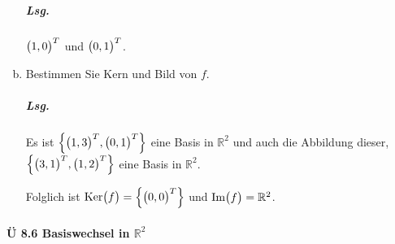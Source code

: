 \documentclass{scrreprt}
\begin{document}
\begin{enumerate}[(a)]
  \subparagraph{Lsg.} $\qty\big(1, 0)^T$ und $\qty\big(0, 1)^T$.

\item Bestimmen Sie Kern und Bild von $f$.

  \subparagraph{Lsg.} Es ist $\qty{\qty\big(1, 3)^T, \qty\big(0, 1)^T}$ eine
  Basis in $\mathbb{R}^2$ und auch die Abbildung dieser,
  $\qty{\qty\big(3, 1)^T, \qty\big(1, 2)^T}$ eine Basis in $\mathbb{R}^2$.

  Folglich ist $\text{Ker}\qty\big(f) = \qty{\qty\big(0, 0)^T}$ und
  $\text{Im}\qty\big(f) = \mathbb{R}^2$.
\end{enumerate}

\paragraph{Ü 8.6 Basiswechsel in $\mathbb{R}^2$}
\end{document}
